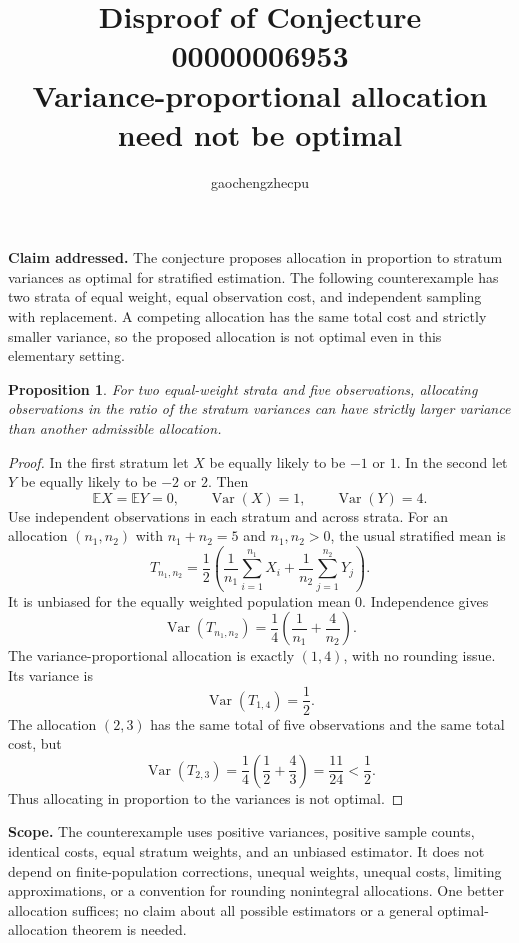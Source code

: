 \documentclass[11pt]{article}
\title{Disproof of Conjecture 00000006953\\Variance-proportional allocation need not be optimal}
\author{gaochengzhecpu}
\date{}
\newtheorem{proposition}{Proposition}
\begin{document}
\maketitle
\noindent\textbf{Claim addressed.} The conjecture proposes allocation in proportion to stratum variances as optimal for stratified estimation. The following counterexample has two strata of equal weight, equal observation cost, and independent sampling with replacement. A competing allocation has the same total cost and strictly smaller variance, so the proposed allocation is not optimal even in this elementary setting.

\begin{proposition}
For two equal-weight strata and five observations, allocating observations in the ratio of the stratum variances can have strictly larger variance than another admissible allocation.
\end{proposition}
\begin{proof}
In the first stratum let $X$ be equally likely to be $-1$ or $1$. In the second let $Y$ be equally likely to be $-2$ or $2$. Then
\[
 \mathbb EX=\mathbb EY=0,\qquad
 \operatorname{Var}(X)=1,\qquad \operatorname{Var}(Y)=4.
\]
Use independent observations in each stratum and across strata. For an allocation $(n_1,n_2)$ with $n_1+n_2=5$ and $n_1,n_2>0$, the usual stratified mean is
\[
 T_{n_1,n_2}=\frac12\left(
 \frac1{n_1}\sum_{i=1}^{n_1}X_i+
 \frac1{n_2}\sum_{j=1}^{n_2}Y_j\right).
\]
It is unbiased for the equally weighted population mean $0$. Independence gives
\[
 \operatorname{Var}(T_{n_1,n_2})
 =\frac14\left(\frac1{n_1}+\frac4{n_2}\right).
\]
The variance-proportional allocation is exactly $(1,4)$, with no rounding issue. Its variance is
\[
 \operatorname{Var}(T_{1,4})=\frac12.
\]
The allocation $(2,3)$ has the same total of five observations and the same total cost, but
\[
 \operatorname{Var}(T_{2,3})
 =\frac14\left(\frac12+\frac43\right)
 =\frac{11}{24}<\frac12.
\]
Thus allocating in proportion to the variances is not optimal.
\end{proof}

\noindent\textbf{Scope.} The counterexample uses positive variances, positive sample counts, identical costs, equal stratum weights, and an unbiased estimator. It does not depend on finite-population corrections, unequal weights, unequal costs, limiting approximations, or a convention for rounding nonintegral allocations. One better allocation suffices; no claim about all possible estimators or a general optimal-allocation theorem is needed.
\end{document}
